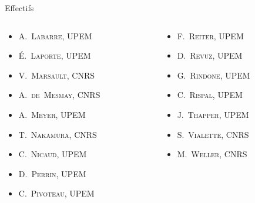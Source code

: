 \documentclass[]{beamer}
\begin{document}
\begin{frame}
\begin{block}{Effectifs}
\begin{overprint}
      \begin{columns}
        \begin{column}{0.5\textwidth}
          \begin{itemize}
            \item \textsc{A.~Labarre}, UPEM
            \item \textsc{\'E.~Laporte}, UPEM
            \item \textsc{V.~Marsault}, CNRS
            \item \textcolor{Nouveau}{\textsc{A.~de~Mesmay}, CNRS}
            \item \textsc{A.~Meyer}, UPEM
            \item \textsc{T.~Nakamura}, CNRS
            \item \textsc{C.~Nicaud}, UPEM
            \item \textsc{D.~Perrin}, UPEM
            \item \textsc{C.~Pivoteau}, UPEM
          \end{itemize}
        \end{column}
        \begin{column}{0.5\textwidth}
          \begin{itemize}
            \item \textcolor{Nouveau}{\textsc{F.~Reiter}, UPEM}
            \item \textsc{D.~Revuz}, UPEM
            \item \textsc{G.~Rindone}, UPEM
            \item \textsc{C.~Rispal}, UPEM
            \item \textsc{J.~Thapper}, UPEM
            \item \textsc{S.~Vialette}, CNRS
            \item \textsc{M.~Weller}, CNRS
          \end{itemize}
        \end{column}
      \end{columns}
    \end{overprint}
  \end{block}
\end{frame}

\end{document}
